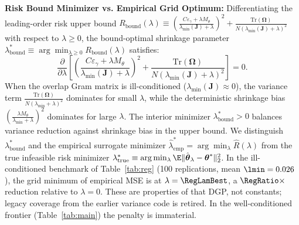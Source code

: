\textbf{Risk Bound Minimizer vs. Empirical Grid Optimum:}
Differentiating the leading-order risk upper bound $R_{\mathrm{bound}}(\lambda) \equiv \left(\frac{C \varepsilon_\gamma + \lambda M_\theta}{\lambda_{\min}(\boldsymbol{J}) + \lambda}\right)^2 + \frac{\mathrm{Tr}(\boldsymbol{\Omega})}{N (\lambda_{\min}(\boldsymbol{J}) + \lambda)^2}$ with respect to $\lambda \ge 0$, the bound-optimal shrinkage parameter $\lambda^*_{\mathrm{bound}} \equiv \arg\min_{\lambda \ge 0} R_{\mathrm{bound}}(\lambda)$ satisfies:
\begin{equation}
    \frac{\partial}{\partial \lambda} \left[ \left(\frac{C \varepsilon_\gamma + \lambda M_\theta}{\lambda_{\min}(\boldsymbol{J}) + \lambda}\right)^2 + \frac{\mathrm{Tr}(\boldsymbol{\Omega})}{N (\lambda_{\min}(\boldsymbol{J}) + \lambda)^2} \right] = 0.
\end{equation}
When the overlap Gram matrix is ill-conditioned ($\lambda_{\min}(\boldsymbol{J}) \approx 0$), the variance term $\frac{\mathrm{Tr}(\boldsymbol{\Omega})}{N (\lambda_{\min} + \lambda)^2}$ dominates for small $\lambda$, while the deterministic shrinkage bias $(\frac{\lambda M_\theta}{\lambda_{\min} + \lambda})^2$ dominates for large $\lambda$. The interior minimizer $\lambda^*_{\mathrm{bound}} > 0$ balances variance reduction against shrinkage bias in the upper bound. We distinguish $\lambda^*_{\mathrm{bound}}$ and the empirical surrogate minimizer $\hat{\lambda}^*_{\mathrm{emp}} = \arg\min_\lambda \hat{R}(\lambda)$ from the true infeasible risk minimizer $\lambda^*_{\mathrm{true}} \equiv \arg\min_\lambda \E\|\hat{\boldsymbol{\theta}}_\lambda - \boldsymbol{\theta}^*\|_2^2$.
In the ill-conditioned benchmark of Table~\ref{tab:reg} (100 replications, mean $\lmin=0.026$), the grid minimum of empirical MSE is at $\lambda=\RegLamBest$, a $\RegRatio\times$ reduction relative to $\lambda=0$. These are properties of that DGP, not constants; legacy coverage from the earlier variance code is retired. In the well-conditioned frontier (Table~\ref{tab:main}) the penalty is immaterial.
\begin{table}[h]\centering\footnotesize
\caption{Regularization path in an ill-conditioned design (\texttt{reports/or\_dml\_regularization\_frontier.csv}).}\label{tab:reg}

\end{table}

